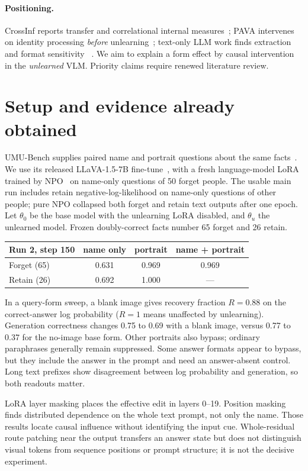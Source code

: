 \documentclass[11pt]{article}
\newcommand{\thu}{\theta_u}
\newcommand{\tho}{\theta_0}
\begin{document}
\paragraph{Positioning.} CrossInf reports transfer and correlational internal
measures~\cite{crossinf}; PAVA intervenes on identity processing \emph{before}
unlearning~\cite{pava}; text-only LLM work finds extraction and format sensitivity
~\cite{hong2024,guo2024}. We aim to explain a form effect by causal intervention in
the \emph{unlearned} VLM. Priority claims require renewed literature review.

\section{Setup and evidence already obtained}
UMU-Bench supplies paired name and portrait questions about the same facts~\cite{umubench}.
We use its released LLaVA-1.5-7B fine-tune~\cite{llava15}, with a fresh language-model
LoRA trained by NPO~\cite{npo} on name-only questions of 50 forget people. The usable
main run includes retain negative-log-likelihood on name-only questions of other
people; pure NPO collapsed both forget and retain text outputs after one epoch.
Let $\tho$ be the base model with the unlearning LoRA disabled, and $\thu$ the
unlearned model. Frozen doubly-correct facts number 65 forget and 26 retain.

\begin{center}\small
\begin{tabular}{@{}lccc@{}}
\toprule
Run 2, step 150 & name only & portrait & name + portrait\\
\midrule
Forget (65) & 0.631 & 0.969 & 0.969\\
Retain (26) & 0.692 & 1.000 & ---\\
\bottomrule
\end{tabular}
\end{center}
In a query-form sweep, a blank image gives recovery fraction $R=0.88$ on the
correct-answer log probability ($R=1$ means unaffected by unlearning). Generation
correctness changes 0.75 to 0.69 with a blank image, versus 0.77 to 0.37 for the
no-image base form. Other portraits also bypass; ordinary paraphrases generally
remain suppressed. Some answer formats appear to bypass, but they include the
answer in the prompt and need an answer-absent control. Long text prefixes show
disagreement between log probability and generation, so both readouts matter.

LoRA layer masking places the effective edit in layers 0--19. Position masking finds
distributed dependence on the whole text prompt, not only the name. Those results
locate causal influence without identifying the input cue. Whole-residual route
patching near the output transfers an answer state but does not distinguish visual
tokens from sequence positions or prompt structure; it is not the decisive experiment.
\end{document}
